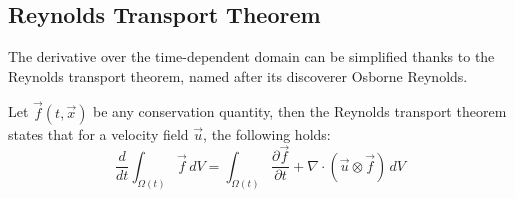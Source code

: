 \subsection{Reynolds Transport Theorem}
The derivative over the time-dependent domain can be simplified thanks to the Reynolds transport theorem, named after its discoverer Osborne Reynolds.

\begin{theorem}\label{thm:rtt}
	Let $\vec{f}(t, \vec{x})$ be any conservation quantity, then the Reynolds transport theorem states that for a velocity field $\vec{u}$, the following holds:
	\begin{equation*}
		\frac{d}{dt}\int_{\Omega (t)}\vec {f} \,dV=\int_{\Omega (t)}{\frac{\partial \vec {f} }{\partial t}} + \nabla\cdot(\vec{u}\otimes\vec{f}) \,dV
	\end{equation*}
\end{theorem}

